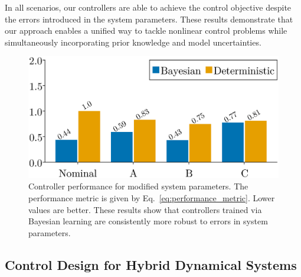 In all scenarios, our controllers are able to achieve the control objective
despite the errors introduced in the system parameters.
%
%
These results demonstrate that our approach enables a unified way to tackle
nonlinear control problems while simultaneously incorporating prior knowledge
and model uncertainties.
%
\begin{figure}[H]
    \centering
    \includegraphics[width=0.7\linewidth]{./figures/pbc_bar.eps}
    \caption{
        Controller performance for modified system parameters. 
        The performance metric is given by
        Eq.~\eqref{eq:performance_metric}.
        Lower values are better. 
        These results show that controllers trained via Bayesian learning are
        consistently more robust to errors in system parameters.
    }
    \label{fig:neuralpbc_bar_plot}
\end{figure}

\subsection{Control Design for Hybrid Dynamical Systems}
\label{ssec:pbc_hybrid}

